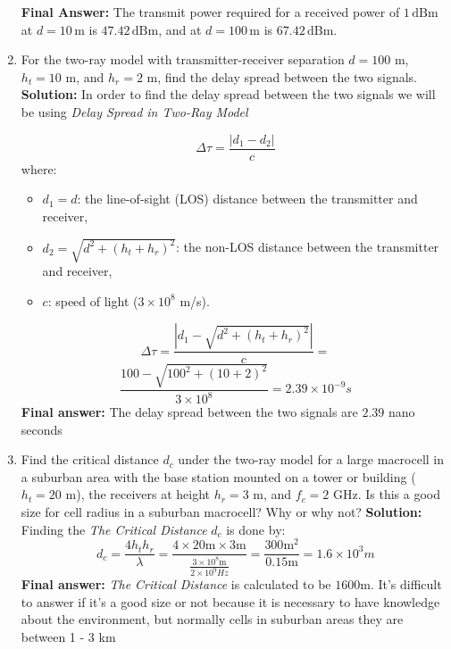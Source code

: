 \documentclass[a4paper,12pt]{book}
\begin{document}
\begin{enumerate}
		
		\textbf{Final Answer:} The transmit power required for a received power of \( 1 \, \text{dBm} \) at \( d = 10 \, \text{m} \) is \( 47.42 \, \text{dBm} \), and at \( d = 100 \, \text{m} \) is \( 67.42 \, \text{dBm} \).
		
		\item For the two-ray model with transmitter-receiver separation $d = 100$ m, $h_t = 10$ m, and $h_r = 2$ m, find the delay spread between the two signals.
		\newline\newline\noindent\textbf{Solution:} In order to find the delay spread between the two signals we will be using \textit{Delay Spread in Two-Ray Model}
		
		\[
		\Delta \tau = \frac{|d_1 - d_2|}{c}
		\]
		where:
		\begin{itemize}
			\item \( d_1 = d \): the line-of-sight (LOS) distance between the transmitter and receiver,
			\item \( d_2 = \sqrt{d^2 + (h_t + h_r)^2} \): the non-LOS distance between the transmitter and receiver,
			\item \( c \): speed of light (\(3 \times 10^8\) m/s).
		\end{itemize}
		
		\[
		\Delta \tau = \frac{|d_1 - \sqrt{d^2 + (h_t + h_r)^2}|}{c}=
		\]
		\[\frac{100-\sqrt{100^2+(10+2)^2}}{3\times10^8}=2.39\times10^{-9}s\]
		\textbf{Final answer:} The delay spread between the two signals are \(2.39\) nano seconds
		
		\item Find the critical distance $d_c$ under the two-ray model for a large macrocell in a suburban area with the base station mounted on a tower or building ($h_t = 20$ m), the receivers at height $h_r = 3$ m, and $f_c = 2$ GHz. Is this a good size for cell radius in a suburban macrocell? Why or why not?
		\newline\newline
		\textbf{Solution:} Finding the \textit{The Critical Distance} \(d_c\) is done by:
		\[
		d_c = \frac{4 h_t h_r}{\lambda}=\frac{4\times20\text{m}\times3\text{m}}{\frac{3\times10^8\text{m}}{2\times10^9Hz}}=\frac{300\text{m}^2}{0.15\text{m}}=1.6\times10^{3}m
		\]
		\textbf{Final answer:} \textit{The Critical Distance} is calculated to be \(1600\text{m}\). It's difficult to answer if it's a good size or not because it is necessary to have knowledge about the environment, but normally cells in suburban areas they are between 1 - 3 km
		 

\end{enumerate}
\end{document}
